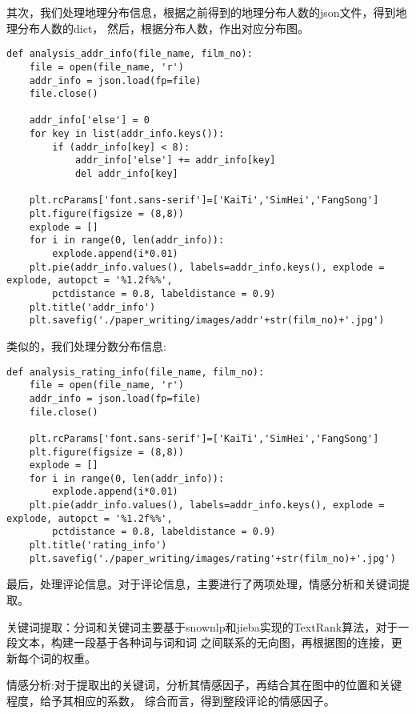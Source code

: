 \documentclass[12pt]{article}
\begin{document}
其次，我们处理地理分布信息，根据之前得到的地理分布人数的json文件，得到地理分布人数的dict，
然后，根据分布人数，作出对应分布图。
\lstset{language=Python}
\begin{lstlisting}
def analysis_addr_info(file_name, film_no):
    file = open(file_name, 'r')
    addr_info = json.load(fp=file)
    file.close()
    
    addr_info['else'] = 0
    for key in list(addr_info.keys()):
        if (addr_info[key] < 8):
            addr_info['else'] += addr_info[key]
            del addr_info[key]

    plt.rcParams['font.sans-serif']=['KaiTi','SimHei','FangSong']
    plt.figure(figsize = (8,8))
    explode = []
    for i in range(0, len(addr_info)):
        explode.append(i*0.01)
    plt.pie(addr_info.values(), labels=addr_info.keys(), explode = explode, autopct = '%1.2f%%',
        pctdistance = 0.8, labeldistance = 0.9)
    plt.title('addr_info')
    plt.savefig('./paper_writing/images/addr'+str(film_no)+'.jpg')
\end{lstlisting}

类似的，我们处理分数分布信息:
\lstset{language=Python}
\begin{lstlisting}
def analysis_rating_info(file_name, film_no):
    file = open(file_name, 'r')
    addr_info = json.load(fp=file)
    file.close()
    
    plt.rcParams['font.sans-serif']=['KaiTi','SimHei','FangSong']
    plt.figure(figsize = (8,8))
    explode = []
    for i in range(0, len(addr_info)):
        explode.append(i*0.01)
    plt.pie(addr_info.values(), labels=addr_info.keys(), explode = explode, autopct = '%1.2f%%',
        pctdistance = 0.8, labeldistance = 0.9)
    plt.title('rating_info')
    plt.savefig('./paper_writing/images/rating'+str(film_no)+'.jpg')
\end{lstlisting}


最后，处理评论信息。对于评论信息，主要进行了两项处理，情感分析和关键词提取。

关键词提取：分词和关键词主要基于snownlp和jieba实现的TextRank算法，对于一段文本，构建一段基于各种词与词和词
之间联系的无向图，再根据图的连接，更新每个词的权重。\cite{mihalceaTextRankBringingOrder}


情感分析:对于提取出的关键词，分析其情感因子，再结合其在图中的位置和关键程度，给予其相应的系数，
综合而言，得到整段评论的情感因子。\cite{itoWordLevelContextualSentiment2020}
\end{document}
